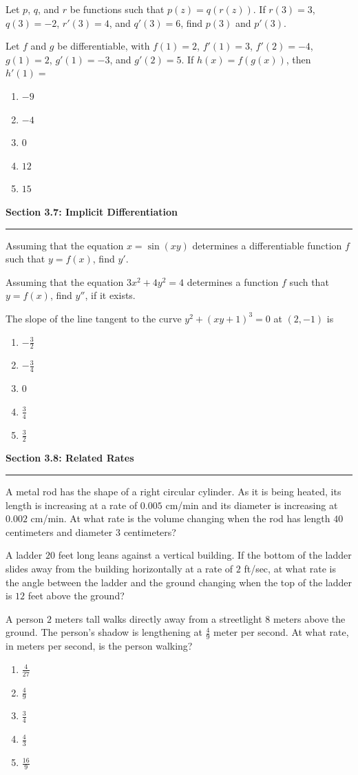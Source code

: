 \documentclass[11pt]{article}
\newcommand{\wsM}{\vspace*{3.1cm}}
\newcommand{\wsL}{\vspace*{5.0cm}}
\newcommand{\prob}[1]{\item[\textbf{#1}]}
\newcommand{\choices}[5]{\begin{enumerate}[label=\textbf{(\Alph*)},leftmargin=2.4em,itemsep=1pt,topsep=4pt]\item #1\item #2\item #3\item #4\item #5\end{enumerate}}
\newcommand{\topicdivider}[2]{%
  \Needspace{11.5cm}%
  \par\medskip
  \noindent\textbf{Section #1: #2}\par
  \vspace{0.25em}
  \noindent\rule{\linewidth}{0.6pt}\par
  \medskip
}
\begin{document}
\Needspace{7cm}
\begin{probs}
\prob{32.} Let $p$, $q$, and $r$ be functions such that $p(z)=q(r(z))$. If $r(3)=3$, $q(3)=-2$, $r'(3)=4$, and $q'(3)=6$, find $p(3)$ and $p'(3)$. \wsM
\end{probs}
\Needspace{7cm}
\begin{probs}
\prob{33.} Let $f$ and $g$ be differentiable, with $f(1)=2$, $f'(1)=3$, $f'(2)=-4$, $g(1)=2$, $g'(1)=-3$, and $g'(2)=5$. If $h(x)=f(g(x))$, then $h'(1)=$\choices{$-9$}{$-4$}{$0$}{$12$}{$15$} \wsM
\end{probs}
\topicdivider{3.7}{Implicit Differentiation}
\Needspace{7cm}
\begin{probs}
\prob{34.} Assuming that the equation $x=\sin(xy)$ determines a differentiable function $f$ such that $y=f(x)$, find $y'$. \wsM
\end{probs}
\Needspace{7cm}
\begin{probs}
\prob{35.} Assuming that the equation $3x^2+4y^2=4$ determines a function $f$ such that $y=f(x)$, find $y''$, if it exists. \wsM
\end{probs}
\Needspace{7cm}
\begin{probs}
\prob{36.} The slope of the line tangent to the curve $y^2+(xy+1)^3=0$ at $(2,-1)$ is\choices{$-\frac32$}{$-\frac34$}{$0$}{$\frac34$}{$\frac32$} \wsM
\end{probs}
\topicdivider{3.8}{Related Rates}
\Needspace{10cm}
\begin{probs}
\prob{37.} A metal rod has the shape of a right circular cylinder. As it is being heated, its length is increasing at a rate of $0.005$ cm/min and its diameter is increasing at $0.002$ cm/min. At what rate is the volume changing when the rod has length $40$ centimeters and diameter $3$ centimeters? \wsL
\end{probs}
\Needspace{10cm}
\begin{probs}
\prob{38.} A ladder $20$ feet long leans against a vertical building. If the bottom of the ladder slides away from the building horizontally at a rate of $2$ ft/sec, at what rate is the angle between the ladder and the ground changing when the top of the ladder is $12$ feet above the ground? \wsL
\end{probs}
\Needspace{7cm}
\begin{probs}
\prob{39.} A person $2$ meters tall walks directly away from a streetlight $8$ meters above the ground. The person's shadow is lengthening at $\frac49$ meter per second. At what rate, in meters per second, is the person walking?\choices{$\frac4{27}$}{$\frac49$}{$\frac34$}{$\frac43$}{$\frac{16}{9}$} \wsM
\end{probs}
\end{document}
